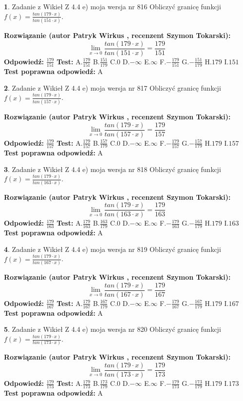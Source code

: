 \documentclass[12pt, a4paper]{article}
\theoremstyle{definition} %
\newtheorem{zad}{}
\newcommand{\zadStart}[1]{\begin{zad}#1\newline}
\newcommand{\zadStop}{\end{zad}}
\newcommand{\rozwStart}[2]{\noindent \textbf{Rozwiązanie (autor #1 , recenzent #2): }\newline}
\newcommand{\rozwStop}{\newline}
\newcommand{\odpStart}{\noindent \textbf{Odpowiedź:}\newline}
\newcommand{\odpStop}{\newline}
\newcommand{\testStart}{\noindent \textbf{Test:}\newline}
\newcommand{\testStop}{\newline}
\newcommand{\kluczStart}{\noindent \textbf{Test poprawna odpowiedź:}\newline}
\newcommand{\kluczStop}{\newline}
\begin{document}
\zadStart{Zadanie z Wikieł Z 4.4 e) moja wersja nr 816}
Obliczyć granicę funkcji $f(x)=\frac{tan(179\cdot x)}{tan(151\cdot x)}$.
\zadStop
\rozwStart{Patryk Wirkus}{Szymon Tokarski}
$$\lim\limits_{x\to 0}\frac{tan(179\cdot x)}{tan(151\cdot x)}=
\frac{179}{151}$$
\rozwStop
\odpStart
$\frac{179}{151}$
\odpStop
\testStart
A.$\frac{179}{151}$
B.$\frac{151}{179}$
C.$0$
D.$-\infty$
E.$\infty$
F.$-\frac{179}{151}$
G.$-\frac{151}{179}$
H.$179$
I.$151$
\testStop
\kluczStart
A
\kluczStop



\zadStart{Zadanie z Wikieł Z 4.4 e) moja wersja nr 817}
Obliczyć granicę funkcji $f(x)=\frac{tan(179\cdot x)}{tan(157\cdot x)}$.
\zadStop
\rozwStart{Patryk Wirkus}{Szymon Tokarski}
$$\lim\limits_{x\to 0}\frac{tan(179\cdot x)}{tan(157\cdot x)}=
\frac{179}{157}$$
\rozwStop
\odpStart
$\frac{179}{157}$
\odpStop
\testStart
A.$\frac{179}{157}$
B.$\frac{157}{179}$
C.$0$
D.$-\infty$
E.$\infty$
F.$-\frac{179}{157}$
G.$-\frac{157}{179}$
H.$179$
I.$157$
\testStop
\kluczStart
A
\kluczStop



\zadStart{Zadanie z Wikieł Z 4.4 e) moja wersja nr 818}
Obliczyć granicę funkcji $f(x)=\frac{tan(179\cdot x)}{tan(163\cdot x)}$.
\zadStop
\rozwStart{Patryk Wirkus}{Szymon Tokarski}
$$\lim\limits_{x\to 0}\frac{tan(179\cdot x)}{tan(163\cdot x)}=
\frac{179}{163}$$
\rozwStop
\odpStart
$\frac{179}{163}$
\odpStop
\testStart
A.$\frac{179}{163}$
B.$\frac{163}{179}$
C.$0$
D.$-\infty$
E.$\infty$
F.$-\frac{179}{163}$
G.$-\frac{163}{179}$
H.$179$
I.$163$
\testStop
\kluczStart
A
\kluczStop



\zadStart{Zadanie z Wikieł Z 4.4 e) moja wersja nr 819}
Obliczyć granicę funkcji $f(x)=\frac{tan(179\cdot x)}{tan(167\cdot x)}$.
\zadStop
\rozwStart{Patryk Wirkus}{Szymon Tokarski}
$$\lim\limits_{x\to 0}\frac{tan(179\cdot x)}{tan(167\cdot x)}=
\frac{179}{167}$$
\rozwStop
\odpStart
$\frac{179}{167}$
\odpStop
\testStart
A.$\frac{179}{167}$
B.$\frac{167}{179}$
C.$0$
D.$-\infty$
E.$\infty$
F.$-\frac{179}{167}$
G.$-\frac{167}{179}$
H.$179$
I.$167$
\testStop
\kluczStart
A
\kluczStop



\zadStart{Zadanie z Wikieł Z 4.4 e) moja wersja nr 820}
Obliczyć granicę funkcji $f(x)=\frac{tan(179\cdot x)}{tan(173\cdot x)}$.
\zadStop
\rozwStart{Patryk Wirkus}{Szymon Tokarski}
$$\lim\limits_{x\to 0}\frac{tan(179\cdot x)}{tan(173\cdot x)}=
\frac{179}{173}$$
\rozwStop
\odpStart
$\frac{179}{173}$
\odpStop
\testStart
A.$\frac{179}{173}$
B.$\frac{173}{179}$
C.$0$
D.$-\infty$
E.$\infty$
F.$-\frac{179}{173}$
G.$-\frac{173}{179}$
H.$179$
I.$173$
\testStop
\kluczStart
A
\kluczStop
\end{document}
